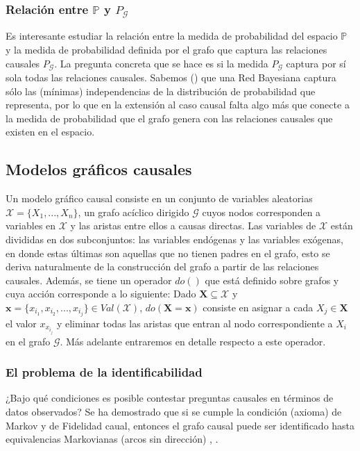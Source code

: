 \documentclass[11pt]{article}
\theoremstyle{plain}
\begin{document}
\subsubsection{Relación entre $\mathbb{P}$ y $P_\mathcal{G}$}{\label{relacion}}
Es interesante estudiar la relación entre la medida de probabilidad del espacio $\mathbb{P}$ y la medida de probabilidad definida por el grafo que captura las relaciones causales $P_\mathcal{G}$. La pregunta concreta que se hace es si la medida $P_\mathcal{G}$ captura por sí sola todas las relaciones causales. Sabemos (\cite{koller2009probabilistic}) que una Red Bayesiana captura sólo las (mínimas) independencias de la distribución de probabilidad que representa, por lo que en la extensión al caso causal falta algo más que conecte a la medida de probabilidad que el grafo genera con las relaciones causales que existen en el espacio.

\subsection{Modelos gráficos causales}
Un modelo gráfico causal consiste en un conjunto de variables aleatorias $\mathcal{X}=\{ X_1,...,X_n \}$, un grafo acíclico dirigido $\mathcal{G}$ cuyos nodos corresponden a variables en $\mathcal{X}$ y las aristas entre ellos a causas directas. Las variables de $\mathcal{X}$ están divididas en dos subconjuntos: las variables endógenas y las variables exógenas, en donde estas últimas son aquellas que no tienen padres en el grafo, esto se deriva naturalmente de la construcción del grafo a partir de las relaciones causales. Además, se tiene un operador $do()$ que está definido sobre grafos y cuya acción corresponde a lo siguiente: Dado $\mathbf{X} \subseteq \mathcal{X}$ y $\mathbf{x} = \{ x_{i_1}, x_{i_2}, ... , x_{i_j} \} \in Val(\mathcal{X})$, $do(\mathbf{X} = \mathbf{x} )$ consiste en asignar a cada $X_j \in \mathbf{X}$ el valor $x_{x_{i_j}}$ y eliminar todas las aristas que entran al nodo correspondiente a $X_i$ en el grafo $\mathcal{G}$. Más adelante entraremos en detalle respecto a este operador.

\subsubsection{El problema de la identificabilidad} 
¿Bajo qué condiciones es posible contestar preguntas causales en términos de datos observados? Se ha demostrado que si se cumple la condición (axioma) de Markov y de Fidelidad caual, entonces el grafo causal puede ser identificado hasta equivalencias Markovianas (arcos sin dirección) \cite{peters2012identifiability}, \cite{mooij2016distinguishing}.
\end{document}
